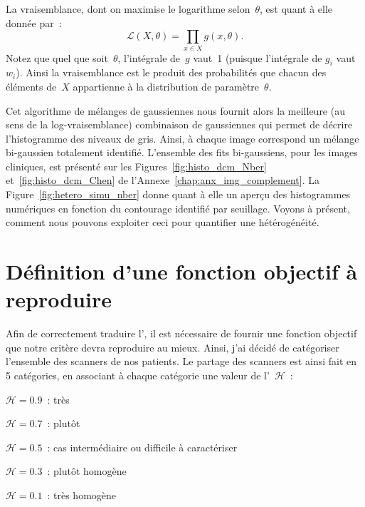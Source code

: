 \documentclass[main.tex]{subfiles}
\begin{document}
La vraisemblance, dont on maximise le logarithme selon~$\theta$, est quant à elle donnée par~:
\begin{equation}
\mathcal{L}(X,\theta) = \prod_{x \in X} g(x,\theta).
\end{equation}
Notez que quel que soit~$\theta$, l'intégrale de~$g$ vaut~1 (puisque l'intégrale de $g_i$ vaut $w_i$). 
Ainsi la vraisemblance est le produit des probabilités que chacun des éléments de~$X$ appartienne à la distribution de paramètre~$\theta$.


Cet algorithme de mélanges de gaussiennes nous fournit alors la meilleure  (au sens de la log-vraisemblance) combinaison de gaussiennes qui permet de décrire l'histogramme des niveaux de gris. Ainsi, à chaque image correspond un mélange bi-gaussien totalement identifié. 
L'ensemble des fits bi-gaussiens, pour les images cliniques, est présenté sur les Figures~\ref{fig:histo_dcm_Nber} et~\ref{fig:histo_dcm_Chen} de l'Annexe~\ref{chap:anx_img_complement}. La Figure~\ref{fig:hetero_simu_nber} donne quant à elle un aperçu des histogrammes numériques en fonction du contourage identifié par seuillage. 
Voyons à présent, comment nous pouvons exploiter ceci pour quantifier une hétérogénéité. 


\section{Définition d'une fonction objectif à reproduire}
Afin de correctement traduire l'\hetero, il est nécessaire de fournir une fonction objectif que notre critère devra reproduire au mieux. Ainsi, j'ai décidé de catégoriser l'ensemble des scanners de nos patients. Le partage des scanners est ainsi fait en 5 catégories, en associant à chaque catégorie une valeur de l'\hetero~$\mathscr{H}$~:
\begin{myitemize}
\item $\mathscr{H}=0.9$~: très \heterogene
\item $\mathscr{H}=0.7$~: plutôt \heterogene
\item $\mathscr{H}=0.5$~: cas intermédiaire ou difficile à caractériser
\item $\mathscr{H}=0.3$~: plutôt homogène
\item $\mathscr{H}=0.1$~: très homogène
\end{myitemize}
\end{document}
